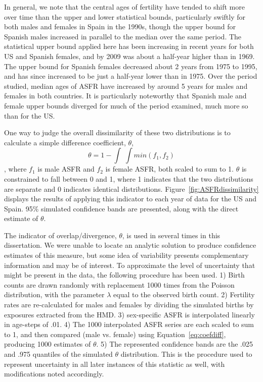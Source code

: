 In general, we note that the central ages of fertility have tended to shift more
over time than the upper and lower statistical bounds, particularly swiftly for
both males and females in Spain in the 1990s, though the upper bound for
Spanish males increased in parallel to the median over the same period. The
statistical upper bound applied here has been increasing in recent years for
both US and Spanish females, and by 2009 was about a half-year higher than in
1969. The upper bound for Spanish females decreased about 2 years from 1975
to 1995, and has since increased to be just a half-year lower than in 1975. Over
the period studied, median ages of ASFR have increased by around 5 years for
males and females in both countries. It is particularly noteworthy that Spanish
male and female upper bounds diverged for much of the period
examined, much more so than for the US.

One way to judge the overall dissimilarity of these two distributions is to
calculate a simple difference coefficient, $\theta$,
\begin{equation}
\label{eq:coefdiff}
\theta = 1 - \int \;\int min(f_1, f_2)
\end{equation}
, where $f_1$ is male ASFR and $f_2$ is female ASFR, both scaled to sum
to 1. $\theta$ is constrained to fall between 0 and 1, where 1 indicates that the
two distributions are separate and 0 indicates identical distributions.
Figure~\ref{fig:ASFRdissimilarity} displays the results of applying this
indicator to each year of data for the US and Spain. 95\% simulated confidence
bands are presented, along with the direct estimate of
$\theta$. 

The indicator of overlap/divergence, $\theta$, is
used in several times in this dissertation. We were unable to locate
an analytic solution to produce confidence estimates of this measure, but
some idea of variability presents complementary information and may be of
interest. To approximate the level of uncertainty that might be present in the
data, the following procedure has been used. 1) Birth counts are drawn randomly
with replacement 1000 times from the Poisson distribution, with the parameter
$\lambda$ equal to the observed birth count. 2) Fertility rates are
re-calculated for males and females by dividing the simulated births by
exposures extracted from the HMD. 3) sex-specific ASFR is interpolated linearly
in age-steps of .01. 4) The 1000 interpolated ASFR series are each scaled to sum
to 1, and then compared (male vs. female) using Equation~\ref{eq:coefdiff},
producing 1000 estimates of $\theta$. 5) The represented confidence bands are the .025 and .975 quantiles
of the simulated $\theta$ distribution. This is the procedure used to represent
uncertainty in all later instances of this statistic as well, with
modifications noted accordingly. 

